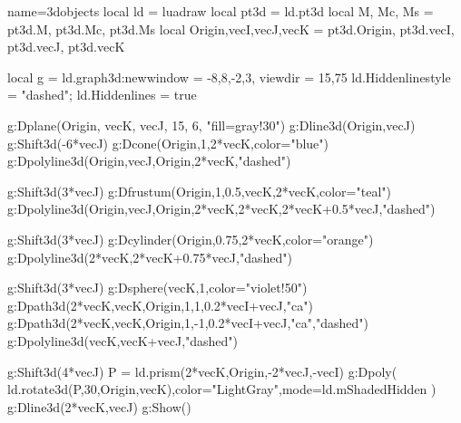 \documentclass{standalone}
\begin{document}
\begin{luadraw}{name=3dobjects}
local ld = luadraw
local pt3d = ld.pt3d
local M, Mc, Ms = pt3d.M, pt3d.Mc, pt3d.Ms
local Origin,vecI,vecJ,vecK = pt3d.Origin, pt3d.vecI, pt3d.vecJ, pt3d.vecK

local g = ld.graph3d:new{window = {-8,8,-2,3}, viewdir = {15,75}}
ld.Hiddenlinestyle = "dashed"; ld.Hiddenlines = true

g:Dplane({Origin, vecK}, vecJ, 15, 6, "fill=gray!30")
g:Dline3d({Origin,vecJ})
g:Shift3d(-6*vecJ)
g:Dcone(Origin,1,2*vecK,{color="blue"})
g:Dpolyline3d({{Origin,vecJ},{Origin,2*vecK}},"dashed")

g:Shift3d(3*vecJ)
g:Dfrustum(Origin,1,0.5,vecK,2*vecK,{color="teal"})
g:Dpolyline3d({{Origin,vecJ},{Origin,2*vecK},{2*vecK,2*vecK+0.5*vecJ}},"dashed")

g:Shift3d(3*vecJ)
g:Dcylinder(Origin,0.75,2*vecK,{color="orange"})
g:Dpolyline3d({2*vecK,2*vecK+0.75*vecJ},"dashed")

g:Shift3d(3*vecJ)
g:Dsphere(vecK,1,{color="violet!50"})
g:Dpath3d({2*vecK,vecK,Origin,1,1,0.2*vecI+vecJ,"ca"})
g:Dpath3d({2*vecK,vecK,Origin,1,-1,0.2*vecI+vecJ,"ca"},"dashed")
g:Dpolyline3d({vecK,vecK+vecJ},"dashed")

g:Shift3d(4*vecJ)
P = ld.prism({2*vecK,Origin,-2*vecJ},-vecI)
g:Dpoly( ld.rotate3d(P,30,{Origin,vecK}),{color="LightGray",mode=ld.mShadedHidden} )
g:Dline3d({2*vecK,vecJ})
g:Show()
\end{luadraw}
\end{document}
